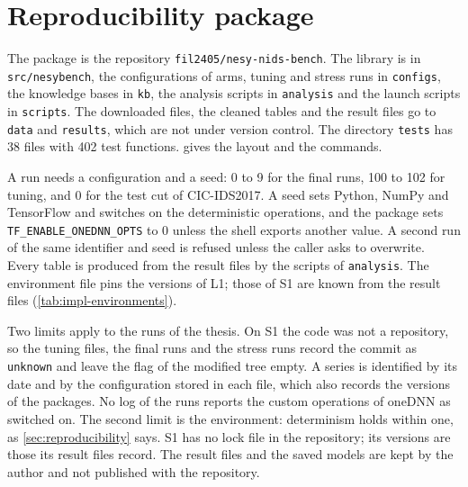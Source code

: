 \section{Reproducibility package}
\label{sec:impl-repro}

The package is the repository \texttt{fil2405/nesy-nids-bench}. The library is in
\texttt{src/nesybench}, the configurations of arms, tuning and stress runs in \texttt{configs},
the knowledge bases in \texttt{kb}, the analysis scripts in \texttt{analysis} and the launch
scripts in \texttt{scripts}. The downloaded files, the cleaned tables and the result files go
to \texttt{data} and \texttt{results}, which are not under version control. The directory
\texttt{tests} has 38 files with 402 test functions.  gives the layout and the
commands.

A run needs a configuration and a seed: 0 to 9 for the final runs, 100 to 102 for tuning, and 0
for the test cut of CIC-IDS2017. A seed sets Python, NumPy and TensorFlow and switches on the
deterministic operations, and the package sets \texttt{TF\_ENABLE\_ONEDNN\_OPTS} to 0 unless the
shell exports another value. A second run of the same identifier and seed is refused unless the
caller asks to overwrite. Every table is produced from the result files by the scripts of
\texttt{analysis}. The environment file pins the versions of L1; those of S1 are
known from the result files (\cref{tab:impl-environments}).

Two limits apply to the runs of the thesis. On S1 the code was not a repository, so
the tuning files, the final runs and the stress runs record the commit as \texttt{unknown} and
leave the flag of the modified tree empty. A series is identified by its date and by the
configuration stored in each file, which also records the versions of the packages. No log of
the runs reports the custom operations of oneDNN as switched on. The second limit is the
environment: determinism holds within one, as \cref{sec:reproducibility} says. S1 has
no lock file in the repository; its versions are those its result files record. The result files
and the saved models are kept by the author and not published with the repository.

